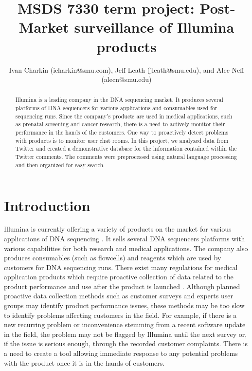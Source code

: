 \documentclass[10pt]{IEEEtran}
\title{MSDS 7330 term project: Post-Market surveillance of Illumina products}
\author{Ivan Charkin (icharkin@smu.com), Jeff Leath (jleath@smu.edu), and Alec Neff (alecn@smu.edu)}
\begin{document}
\maketitle

\begin{abstract}
Illumina is a leading company in the DNA sequencing market.  It produces several platforms of DNA sequencers for various applications and consumables used for sequencing runs.  Since the company's products are used in medical applications, such as prenatal screening and cancer research, there is a need to actively monitor their performance in the hands of the customers.  One way to proactively detect problems with products is to monitor user chat rooms. In this project, we analyzed data from Twitter and created a demonstrative database for the information contained within the Twitter comments. The comments were preprocessed using natural language processing and then organized for easy search. 
\end{abstract}

\section{Introduction}
Illumina is currently offering a variety of products on the market for various applications of DNA sequencing \cite{Illprod}. It sells several DNA sequencers platforms with various capabilities for both research and medical applications. The company also produces consumables (such as flowcells) and reagents which are used by customers for DNA sequencing runs. There exist many regulations for medical application products which require proactive collection of data related to the product performance and use after the product is launched \cite{PMS}. Although planned proactive data collection methods such as customer surveys and experts user groups may identify product performance issues, these methods may be too slow to identify problems affecting customers in the field. For example, if there is a new recurring problem or inconvenience stemming from a recent software update in the field, the problem may not be flagged by Illumina until the next survey or, if the issue is serious enough, through the recorded customer complaints. There is a need to create a tool allowing immediate response to any potential problems with the product once it is in the hands of customers. 
\end{document}
